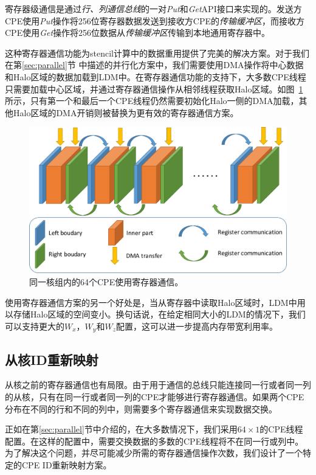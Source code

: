 \documentclass[degree=doctor]{thuthesis}
\begin{document}
寄存器级通信是通过\emph{行、列通信总线}的一对\emph{Put}和\emph{Get}API接口来实现的。发送方CPE使用\emph {Put}操作将256位寄存器数据发送到接收方CPE的\emph{传输缓冲区}，而接收方CPE使用\emph{Get}操作将256位数据从\emph{传输缓冲区}传输到本地通用寄存器中。

这种寄存器通信功能为stencil计算中的数据重用提供了完美的解决方案。对于我们在第\ref{sec:parallel}节
中描述的并行化方案中，我们需要使用DMA操作将中心数据和Halo区域的数据加载到LDM中。在寄存器通信功能的支持下，大多数CPE线程只需要加载中心区域，并通过寄存器通信操作从相邻线程获取Halo区域。如图~\ref{fig:64by1-reg}所示，只有第一个和最后一个CPE线程仍然需要初始化Halo一侧的DMA加载，其他Halo区域的DMA开销则被替换为更有效的寄存器通信方案。


\begin{figure}[ht]
\centering
\includegraphics[width=0.7\columnwidth]{awp_using_register.png}
\caption{同一核组内的64个CPE使用寄存器通信。}
\label{fig:64by1-reg}
\end{figure}

使用寄存器通信方案的另一个好处是，当从寄存器中读取Halo区域时，LDM中用以存储Halo区域的空间变小。换句话说，在给定相同大小的LDM的情况下，我们可以支持更大的$ W_x $，$ W_y $和$ W_z $配置，这可以进一步提高内存带宽利用率。

\subsection{从核ID重新映射}

从核之前的寄存器通信也有局限。由于用于通信的总线只能连接同一行或者同一列的从核，只有在同一行或者同一列的CPE才能够进行寄存器通信。如果两个CPE分布在不同的行和不同的列中，则需要多个寄存器通信来实现数据交换。

正如在第\ref{sec:parallel}节中介绍的，在大多数情况下，我们采用$ 64 \times1 $的CPE线程配置。在这样的配置中，需要交换数据的多数的CPE线程将不在同一行或列中。为了解决这个问题，并尽可能减少所需的寄存器通信操作次数，我们设计了一个特定的CPE ID重新映射方案。
\end{document}
